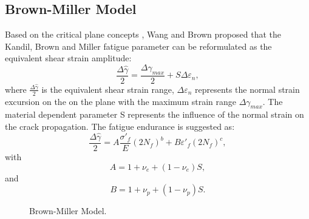 \documentclass[preprint,5p,twocolumn,11pt,sort&compress]{elsarticle}
\begin{document}
\subsection{Brown-Miller Model}
Based on the critical plane concepts \cite{Brown2006}, Wang and Brown \cite{Wang1993} proposed that the Kandil, Brown and Miller fatigue parameter \cite{Kandil1982} can be reformulated as the equivalent shear strain amplitude:
\begin{equation}
\frac{{\Delta \hat \gamma }}{2} = \frac{{\Delta {\gamma _{max}}}}{2} + S\Delta {\varepsilon _n},
\label{Equ:ShearStrainBM}
\end{equation}
where $\frac{{\Delta \hat \gamma }}{2}$ is the equivalent shear strain range, $\Delta {\varepsilon _n}$ represents the normal strain excursion on the on the plane with the maximum strain range $\Delta {\gamma _{max}}$. The material dependent parameter S represents the influence of the normal strain on the crack propagation.
The fatigue endurance is suggested as:
\begin{equation}
\frac{{\Delta \hat \gamma }}{2} = A\frac{{{{\sigma '}_f}}}{E}{\left( {2{N_f}} \right)^b} + B{{\varepsilon '}_f}{\left( {2{N_f}} \right)^c},
\end{equation}
with
\[A = 1 + {\nu _e} + \left( {1 - {\nu _e}} \right)S,\]
and
\[B = 1 + {\nu _p} + \left( {1 - {\nu _p}} \right)S.\]
\begin{figure}[!htp]
\caption{Brown-Miller Model.}
\label{Fig:NF-NP-TMF-BM}
\end{figure}
\end{document}
